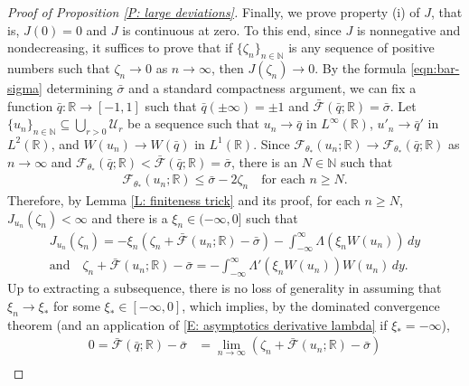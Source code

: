 \documentclass[12pt]{amsart}
\begin{document}
\begin{proof}[Proof of Proposition \ref{P: large deviations}]
        	
        Finally, we prove property (i) of $J$, that is, $J(0) = 0$ and $J$ is continuous at zero.  To this end, since $J$ is nonnegative and nondecreasing, it suffices to prove that if $\{\zeta_{n}\}_{n \in \mathbb{N}}$ is any sequence of positive numbers such that $\zeta_{n} \to 0$ as $n \to \infty$, then $J(\zeta_{n}) \to 0$. By the formula \eqref{eqn:bar-sigma} determining $\bar{\sigma}$ and a standard compactness argument, we can fix a function $\bar{q} : \mathbb{R} \to [-1,1]$ such that $\bar{q}(\pm \infty) = \pm 1$ and $\bar{\mathscr{F}}(\bar{q};\mathbb{R}) = \bar{\sigma}$.  Let $\{u_{n}\}_{n \in \mathbb{N}} \subseteq \bigcup_{r > 0} \mathcal{U}_{r}$ be a sequence such that $u_{n} \to \bar{q}$ in $L^{\infty}(\mathbb{R})$, $u'_{n} \to \bar{q}'$ in $L^{2}(\mathbb{R})$, and $W(u_{n}) \to W(\bar{q})$ in $L^{1}(\mathbb{R})$.  Since $\mathscr{F}_{\theta_{*}}(u_{n};\mathbb{R}) \to \mathscr{F}_{\theta_{*}}(\bar{q};\mathbb{R})$ as $n \to \infty$ and $\mathscr{F}_{\theta_{*}}(\bar{q};\mathbb{R}) < \bar{\mathscr{F}}(\bar{q};\mathbb{R}) = \bar{\sigma}$, there is an $N \in \mathbb{N}$ such that 
            \begin{align*}
                \mathscr{F}_{\theta_{*}}(u_{n};\mathbb{R}) \leq \bar{\sigma} - 2\zeta_{n} \quad \text{for each} \, \, n \geq N. 
            \end{align*}
        Therefore, by Lemma \ref{L: finiteness trick} and its proof, for each $n \geq N$, $J_{u_{n}}(\zeta_{n}) < \infty$ and there is a $\xi_{n} \in (-\infty,0]$ such that 
        	\begin{align}
		J_{u_{n}}(\zeta_{n}) = - \xi_{n} ( \zeta_{n} + \bar{\mathscr{F}}(u_{n}; \mathbb{R}) - \bar{\sigma} ) - \int_{-\infty}^{\infty} \Lambda ( \xi_{n} W(u_{n}) ) \, dy  \label{E: analyze J at zero} \\
		\text{and} \quad \zeta_{n} + \bar{\mathscr{F}}(u_{n};\mathbb{R}) - \bar{\sigma} = - \int_{-\infty}^{\infty} \Lambda'( \xi_{n} W(u_{n}) ) W(u_{n}) \, dy. \nonumber
	\end{align}
Up to extracting a subsequence, there is no loss of generality in assuming that $\xi_{n} \to \xi_{*}$ for some $\xi_{*} \in [-\infty,0]$, which implies, by the dominated convergence theorem (and an application of \eqref{E: asymptotics derivative lambda} if $ \xi_* = - \infty $),
	\begin{align*}
		0 = \bar{\mathscr{F}}(\bar{q}; \mathbb{R}) - \bar{\sigma} &= \lim_{n \to \infty} \left( \zeta_{n} + \bar{\mathscr{F}}(u_{n};\mathbb{R}) - \bar{\sigma} \right) \\

\end{align*}
\end{proof}
\end{document}
